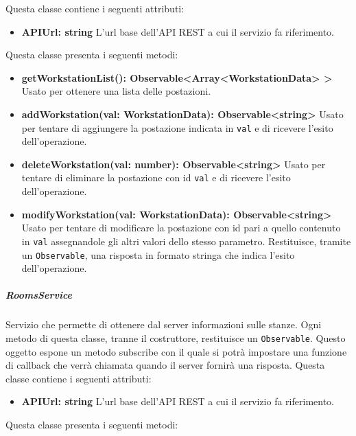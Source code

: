 Questa classe contiene i seguenti attributi:
\begin{itemize}
	\item \textbf{APIUrl: string} \newline
	L'url base dell'API REST a cui il servizio fa riferimento.
\end{itemize}
Questa classe presenta i seguenti metodi:
\begin{itemize}
	\item \textbf{getWorkstationList(): Observable<Array<WorkstationData> > 	} \newline
	Usato per ottenere una lista delle postazioni.
	\item \textbf{addWorkstation(val: WorkstationData): Observable<string> 	} \newline
	Usato per tentare di aggiungere la postazione indicata in \texttt{val} e di ricevere l'esito dell'operazione.
	\item \textbf{deleteWorkstation(val: number): Observable<string> 	} \newline
	Usato per tentare di eliminare la postazione con id \texttt{val} e di ricevere l'esito dell'operazione.
	\item \textbf{modifyWorkstation(val: WorkstationData): Observable<string>} \newline
	Usato per tentare di modificare la postazione con id pari a quello contenuto in \texttt{val} assegnandole gli altri valori dello stesso parametro. Restituisce, tramite un \texttt{Observable}, una risposta in formato stringa che indica l'esito dell'operazione.
\end{itemize}
\subparagraph{RoomsService}
Servizio che permette di ottenere dal server informazioni sulle stanze. Ogni metodo di questa classe, tranne il costruttore, restituisce un \texttt{Observable}. Questo oggetto espone un metodo subscribe con il quale si potrà impostare una funzione di callback che verrà chiamata quando il server fornirà una risposta. \newline
Questa classe contiene i seguenti attributi:
\begin{itemize}
	\item \textbf{APIUrl: string} \newline
	L'url base dell'API REST a cui il servizio fa riferimento.
\end{itemize}
Questa classe presenta i seguenti metodi:
